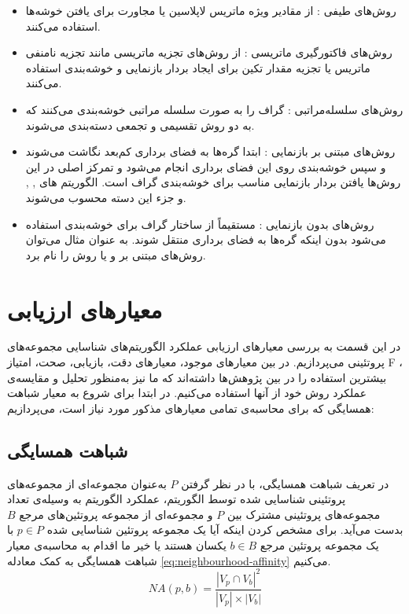 \begin{itemize}
    \item روش‌های طیفی : از مقادیر ویژه  ماتریس لاپلاسین یا مجاورت برای یافتن خوشه‌ها استفاده می‌کنند.
    \item روش‌های فاکتورگیری ماتریسی : از روش‌های تجزیه‌ ماتریسی مانند تجزیه نامنفی ماتریس  یا تجزیه مقدار تکین  برای ایجاد  بردار بازنمایی و خوشه‌بندی استفاده می‌کنند.
    \item روش‌های سلسله‌مراتبی : گراف را به صورت سلسله ‌مراتبی خوشه‌بندی می‌کنند که به دو روش تقسیمی و تجمعی دسته‌بندی می‌شوند.
    \item روش‌های مبتنی بر بازنمایی : ابتدا گره‌ها به فضای برداری کم‌بعد نگاشت می‌شوند و سپس خوشه‌بندی روی این فضای برداری انجام می‌شود و تمرکز اصلی در این روش‌ها یافتن بردار بازنمایی مناسب برای خوشه‌بندی گراف است. الگوریتم های , ,  و  جزء این دسته محسوب می‌شوند.
    \item روش‌های بدون بازنمایی : مستقیماً از ساختار گراف برای خوشه‌بندی استفاده می‌شود بدون اینکه گره‌ها به فضای برداری منتقل شوند. به عنوان مثال می‌توان روش‌های مبتنی بر  و یا روش  را نام برد.

\end{itemize}

\section{معیار‌های ارزیابی}
در این قسمت به بررسی معیار‌های ارزیابی عملکرد الگوریتم‌های شناسایی مجموعه‌های پروتئینی می‌پردازیم. در بین معیار‌های موجود، معیارهای دقت، بازیابی، صحت، امتیاز F ، بیشترین استفاده را در بین پژوهش‌ها داشته‌اند که ما نیز به‌منظور تحلیل و مقایسه‌ی عملکرد روش خود از آنها استفاده می‌کنیم.
در ابتدا برای شروع به معیار شباهت همسایگی که برای محاسبه‌ی تمامی معیار‌های مذکور مورد نیاز است، می‌پردازیم:
\subsection{شباهت همسایگی}

در تعریف شباهت همسایگی، با در نظر گرفتن $P$ به‌عنوان مجموعه‌ای از مجموعه‌های پروتئینی شناسایی شده توسط الگوریتم، عملکرد الگوریتم به وسیله‌ی تعداد مجموعه‌های پروتئینی مشترک بین $P$ و مجموعه‌ای از مجموعه پروتئین‌های مرجع $B$ بدست می‌آید. برای مشخص کردن اینکه آیا یک مجموعه پروتئین شناسایی شده $p \in P$ با یک مجموعه پروتئین مرجع $b \in B$ یکسان هستند یا خیر ما اقدام به محاسبه‌ی معیار شباهت همسایگی به کمک معادله \ref{eq:neighbourhood-affinity} می‌کنیم.
\begin{equation}
NA(p,b) = \frac{|V_p \cap V_b|^2}{|V_p| \times |V_b|}
\label{eq:neighbourhood-affinity}
\end{equation}

